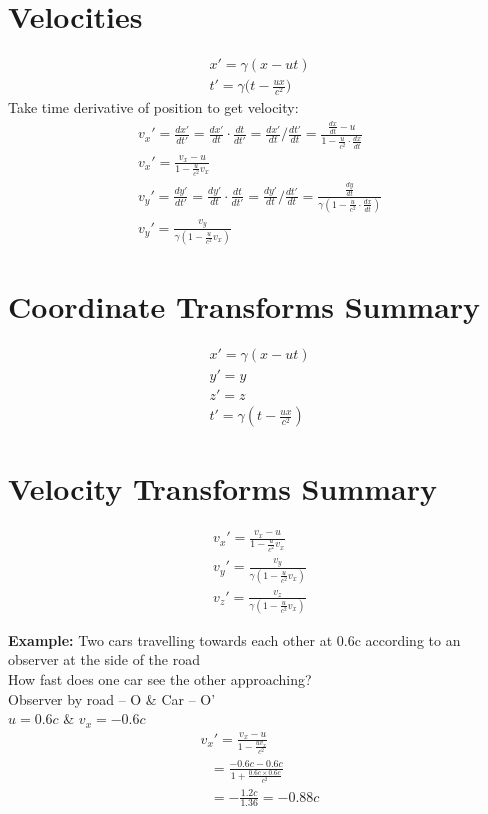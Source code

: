\documentclass[a4paper, 11pt, fleqn, normalem]{report}
\begin{document}
\section{Velocities}
\vspace{-24pt}
\begin{gather*}
    x' = \gamma(x - ut) \\
    t' = \gamma\Big(t - \frac{ux}{c^{2}}\Big)
\end{gather*}
Take time derivative of position to get velocity:
\begin{gather*}
    v_{x}' = \frac{dx'}{dt'} = \frac{dx'}{dt}\cdot\frac{dt}{dt'} = \frac{dx'}{dt}\Big/\frac{dt'}{dt} = \frac{\tfrac{dx}{dt} - u}{1 - \tfrac{u}{c^{2}}\cdot\tfrac{dx}{dt}} \\
    v_{x}' = \frac{v_{x} - u}{1 - \tfrac{u}{c^{2}}v_{x}} \\
    v_{y}' = \frac{dy'}{dt'} = \frac{dy'}{dt}\cdot\frac{dt}{dt'} = \frac{dy'}{dt}\Big/\frac{dt'}{dt} = \frac{\tfrac{dy}{dt}}{\gamma(1 - \tfrac{u}{c^{2}}\cdot\tfrac{dx}{dt})} \\
    v_{y}' = \frac{v_{y}}{\gamma(1 - \tfrac{u}{c^{2}}v_{x})}
\end{gather*}

\section{Coordinate Transforms Summary}
\vspace{-24pt}
\begin{gather*}
    x' = \gamma(x - ut) \\
    y' = y \\
    z' = z \\
    t' = \gamma(t - \frac{ux}{c^2})
\end{gather*}

\section{Velocity Transforms Summary}
\vspace{-24pt}
\begin{gather*}
    v_{x}' = \frac{v_{x} - u}{1 - \tfrac{u}{c^{2}}v_{x}} \\
    v_{y}' = \frac{v_{y}}{\gamma(1 - \tfrac{u}{c^{2}}v_{x})} \\
    v_{z}' = \frac{v_{z}}{\gamma(1 - \tfrac{u}{c^{2}}v_{x})}
\end{gather*}

\textbf{Example: }Two cars travelling towards each other at 0.6c according to an observer at the side of the road \\
How fast does one car see the other approaching? \\
Observer by road -- O \& Car -- O' \\
$u = 0.6c$ \& $v_{x} = -0.6c$
\begin{gather*}
    v_{x}' = \frac{v_{x} - u}{1 - \tfrac{uv_{x}}{c^{2}}} \\
    ~~~ = \frac{-0.6c - 0.6c}{1 + \tfrac{0.6c\times0.6c}{c^{2}}} \\
    ~~~ = -\frac{1.2c}{1.36} = -0.88c
\end{gather*}
\end{document}
